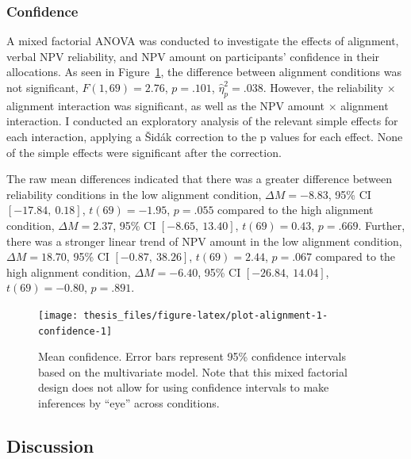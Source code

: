 \documentclass[a4paper, nobind, dvipsnames]{templates/ociamthesis}
\theoremstyle{definition}
\theoremstyle{definition}
\theoremstyle{definition}
\theoremstyle{definition}
\theoremstyle{remark}
\begin{document}
\subsubsection{Confidence}

A mixed factorial ANOVA was conducted to investigate the effects of alignment,
verbal NPV reliability, and NPV amount on participants' confidence in their
allocations. As seen in Figure~\ref{fig:plot-alignment-1-confidence}, the
difference between alignment conditions was not significant,
\(F(1, 69) = 2.76\), \(p = .101\), \(\hat{\eta}^2_p = .038\). However, the reliability \(\times\)
alignment interaction was significant, as well as the NPV amount \(\times\)
alignment interaction. I conducted an exploratory analysis of the relevant
simple effects for each interaction, applying a Šidák correction to the p values
for each effect. None of the simple effects were significant after the
correction.

The raw mean differences indicated that there was a greater difference between
reliability conditions in the low alignment condition,
\(\Delta M = -8.83\), 95\% CI \([-17.84,~0.18]\), \(t(69) = -1.95\), \(p = .055\) compared to the high alignment
condition, \(\Delta M = 2.37\), 95\% CI \([-8.65,~13.40]\), \(t(69) = 0.43\), \(p = .669\). Further, there was
a stronger linear trend of NPV amount in the low alignment condition,
\(\Delta M = 18.70\), 95\% CI \([-0.87,~38.26]\), \(t(69) = 2.44\), \(p = .067\) compared to the high alignment
condition, \(\Delta M = -6.40\), 95\% CI \([-26.84,~14.04]\), \(t(69) = -0.80\), \(p = .891\).



\begin{figure}
\texttt{[image: thesis\_files/figure-latex/plot-alignment-1-confidence-1]} \caption{Mean confidence. Error bars represent 95\% confidence intervals based on the multivariate model. Note that this mixed factorial design does not allow for using confidence intervals to make inferences by ``eye'' across conditions.}\label{fig:plot-alignment-1-confidence}
\end{figure}

\subsection{Discussion}
\end{document}
